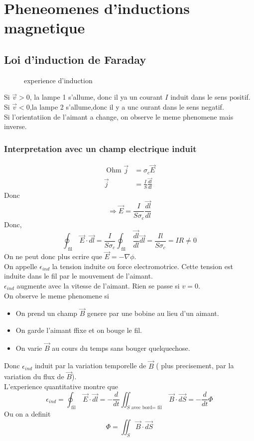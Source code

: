 \documentclass[../main.tex]{subfiles}
\begin{document}
\section{Pheneomenes d'inductions magnetique}
\subsection{Loi d'induction de Faraday}
\begin{figure}[H]
    \centering
    \caption{experience d'induction}
    \label{fig:experience-d'induction}
\end{figure}
Si $\vec{v}>0$, la lampe 1 s'allume, donc il ya un courant $I$ induit dans le sens positif.\\
Si $\vec{v}<0$,la lampe 2 s'allume,donc il y a unc ourant dans le sens negatif.\\
Si l'orientatiion de l'aimant a change, on observe le meme phenomene mais inverse.
\subsubsection*{Interpretation avec un champ electrique induit}
\begin{align*}
\text{ Ohm } \vec{j} &= \sigma_c \vec{E}\\
\vec{j} &= \frac{I}{S} \frac{\vec{dl}}{dl}
\end{align*}
Donc
\[ 
\Rightarrow \vec{E} = \frac{I}{S \sigma_c}\frac{\vec{dl}}{dl}
\]
Donc,
\[ 
	\oint_{ \text{ fil } } \vec{E} \cdot \vec{dl}  = \frac{I}{S \sigma_c} \oint_{ \text{ fil } } \frac{\vec{dl}}{dl}\vec{dl}= \frac{Il}{S \sigma_c} = IR \neq 0
\]
On ne peut donc plus ecrire que $\vec{E}= - \nabla \phi$.\\
On appelle $\epsilon_{ind} $ la tension induite ou force electromotrice.
Cette tension est induite dans le fil par le mouvement de l'aimant.\\
$\epsilon_{ind} $ augmente avec la vitesse de l'aimant.
Rien se passe si $v=0$.\\
On observe le meme phenomene si
\begin{itemize}
\item On prend un champ $\vec{B}$ genere par une bobine au lieu d'un aimant.
\item On garde l'aimant ffixe et on bouge le fil.
\item On varie $\vec{B}$ au cours du temps sans bouger quelquechose.
\end{itemize}
Donc $\epsilon_{ind} $ induit par la variation temporelle de $\vec{B}$ ( plus precisement, par la variation du flux de $\vec{B}$).\\
L'experience  quantitative montre que 
\[ 
	\epsilon_{ind} = \oint_{ \text{ fil } } \vec{E}\cdot \vec{dl} = - \frac{d}{dt} \iint_{ S \text{ avec bord= fil } } \vec{B}\cdot \vec{dS} = - \frac{d}{dt}\Phi
\]
Ou on a definit
\[ 
\Phi = \iint_S \vec{B}\cdot \vec{dS}
\]


		
\end{document}
